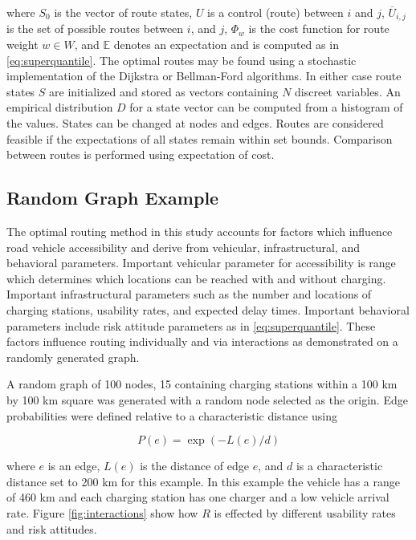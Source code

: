 \documentclass[11pt]{article}
\begin{document}
\begin{multicols}{2}
where $S_0$ is the vector of route states, $U$ is a control (route) between $i$ and $j$, $\overline{U}_{i,j}$ is the set of possible routes between $i$, and $j$, $\Phi_w$ is the cost function for route weight $w \in W$, and $\mathbb{E}$ denotes an expectation and is computed as in \eqref{eq:superquantile}. The optimal routes may be found using a stochastic implementation of the Dijkstra or Bellman-Ford algorithms. In either case route states $S$ are initialized and stored as vectors containing $N$ discreet variables. An empirical distribution $D$ for a state vector can be computed from a histogram of the values. States can be changed at nodes and edges. Routes are considered feasible if the expectations of all states remain within set bounds. Comparison between routes is performed using expectation of cost.

\subsection*{Random Graph Example}

The optimal routing method in this study accounts for factors which influence road vehicle accessibility and derive from vehicular, infrastructural, and behavioral parameters. Important vehicular parameter for accessibility is range which determines which locations can be reached with and without charging. Important infrastructural parameters such as the number and locations of charging stations, usability rates, and expected delay times. Important behavioral parameters include risk attitude parameters as in \eqref{eq:superquantile}. These factors influence routing individually and via interactions as demonstrated on a randomly generated graph.

A random graph of 100 nodes, 15 containing charging stations within a 100 km by 100 km square was generated with a random node selected as the origin. Edge probabilities were defined relative to a characteristic distance using

\begin{equation}
	P(e) = \exp(-L(e)/d)
\end{equation}

where $e$ is an edge, $L(e)$ is the distance of edge $e$, and $d$ is a characteristic distance set to 200 km for this example. In this example the vehicle has a range of 460 km and each charging station has one charger and a low vehicle arrival rate. Figure \ref{fig:interactions} show how $R$ is effected by different usability rates and risk attitudes.

\end{multicols}
\end{document}
